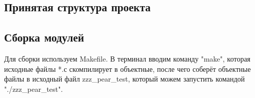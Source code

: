 \subsection{Принятая структура проекта}


\subsection{Сборка модулей}

Для сборки используем Makefile. В терминал вводим команду "make", которая исходные файлы *.с скомпилирует в объектные, после чего соберёт объектные файлы в исходный файл zzz\_pear\_test, который можем запустить командой "./zzz\_pear\_test".

